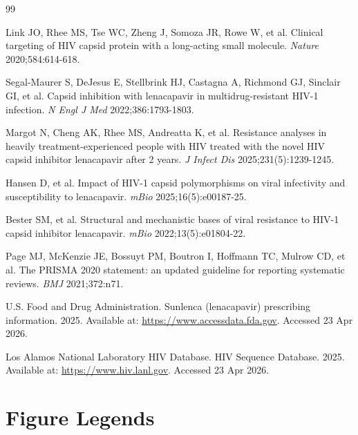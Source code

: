 \documentclass[preprint,authoryear]{elsarticle}
\begin{document}
\begin{thebibliography}{99}

 Link JO, Rhee MS, Tse WC, Zheng J, Somoza JR, Rowe W, et al. Clinical targeting of HIV capsid protein with a long-acting small molecule. \textit{Nature} 2020;584:614-618.

 Segal-Maurer S, DeJesus E, Stellbrink HJ, Castagna A, Richmond GJ, Sinclair GI, et al. Capsid inhibition with lenacapavir in multidrug-resistant HIV-1 infection. \textit{N Engl J Med} 2022;386:1793-1803.

 Margot N, Cheng AK, Rhee MS, Andreatta K, et al. Resistance analyses in heavily treatment-experienced people with HIV treated with the novel HIV capsid inhibitor lenacapavir after 2 years. \textit{J Infect Dis} 2025;231(5):1239-1245.

 Hansen D, et al. Impact of HIV-1 capsid polymorphisms on viral infectivity and susceptibility to lenacapavir. \textit{mBio} 2025;16(5):e00187-25.

 Bester SM, et al. Structural and mechanistic bases of viral resistance to HIV-1 capsid inhibitor lenacapavir. \textit{mBio} 2022;13(5):e01804-22.

 Page MJ, McKenzie JE, Bossuyt PM, Boutron I, Hoffmann TC, Mulrow CD, et al. The PRISMA 2020 statement: an updated guideline for reporting systematic reviews. \textit{BMJ} 2021;372:n71.

 U.S. Food and Drug Administration. Sunlenca (lenacapavir) prescribing information. 2025. Available at: \url{https://www.accessdata.fda.gov}. Accessed 23 Apr 2026.

 Los Alamos National Laboratory HIV Database. HIV Sequence Database. 2025. Available at: \url{https://www.hiv.lanl.gov}. Accessed 23 Apr 2026.

\end{thebibliography}

\newpage
\section*{Figure Legends}
\end{document}
